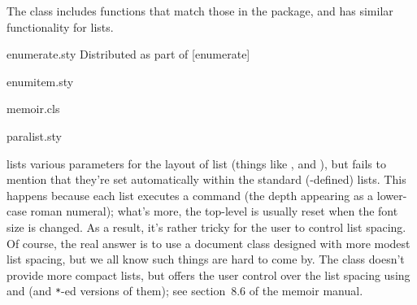 The  class includes functions that match those in the
 package, and has similar functionality for
 lists.
\begin{ctanrefs}
\item[enumerate.sty]Distributed as part of [enumerate]
\item[enumitem.sty]
\item[memoir.cls]
\item[paralist.sty]
\end{ctanrefs}


 lists various
parameters for the layout of list (things like ,
 and ), but fails to mention that they're set
automatically within the standard (\latex{}-defined) lists.  This
happens because each list
executes a command \texttt{} (the depth
appearing as a lower-case roman numeral); what's more, the top-level
 is usually reset when the font size is changed.  As a
result, it's rather tricky for 
the user to control list spacing.  Of course, the real answer is to use
a document class designed with more modest list spacing, but we all
know such things are hard to come by.  The  class doesn't
provide more compact lists, but offers the user control over the list
spacing using  and  (and \texttt{*}-ed
versions of them); see section~8.6 of the memoir manual.

